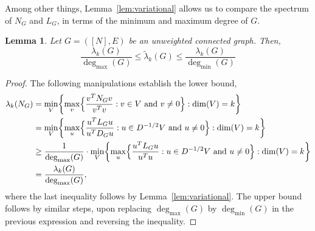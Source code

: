 \documentclass{article}
\newcommand{\1}{\mathbf{1}}
\newcommand{\wt}[1]{\widetilde{#1}}
\theoremstyle{alden}
\theoremstyle{aldenthm}
\newtheorem{lemma}{Lemma}
\theoremstyle{definition}
\theoremstyle{remark}
\begin{document}
Among other things, Lemma~\ref{lem:variational} allows us to compare the spectrum of $N_G$ and $L_G$, in terms of the minimum and maximum degree of $G$.
\begin{lemma}
	Let $G = ([N],E)$ be an unweighted connected graph. Then,
	\begin{equation*}
	\frac{{\lambda}_k(G)}{\deg_{\max}(G)} \leq \wt{\lambda}_k(G)  \leq \frac{{\lambda}_k(G)}{\deg_{\min}(G)}
	\end{equation*}
\end{lemma}
\begin{proof}
	The following manipulations establish the lower bound,
	\begin{align*}
	\lambda_k(N_G) & = \min_V \biggl\{ \max_{v} \Bigl\{\frac{v^T N_G v}{v^T v}: v \in V~\textrm{and}~ v \neq 0 \Bigr\}: \dim(V) = k \biggr\} \\
	& = \min_V \biggl\{ \max_{u} \Bigl\{\frac{u^T L_G u}{u^T D_G u}: u \in D^{-1/2} V~\textrm{and}~ u \neq 0 \Bigr\}: \dim(V) = k \biggr\} \\
	& \geq \frac{1}{\deg_{\max}(G)} \cdot \min_V \biggl\{ \max_{u} \Bigl\{\frac{u^T L_G u}{u^T u}: u \in D^{-1/2} V~\textrm{and}~ u \neq 0 \Bigr\}: \dim(V) = k \biggr\} \\
	& = \frac{\lambda_k(G)}{\deg_{\max}(G)},
	\end{align*}
	where the last inequality follows by Lemma~\ref{lem:variational}. The upper bound follows by similar steps, upon replacing $\deg_{\max}(G)$ by $\deg_{\min}(G)$ in the previous expression and reversing the inequality.
\end{proof}
\end{document}
